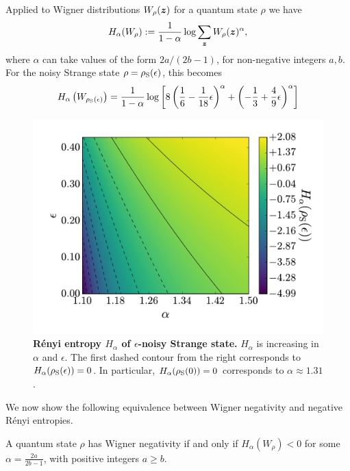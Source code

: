 \documentclass[pra,
aps,
twocolumn,
superscriptaddress,
groupedaddress,
nofootinbib,
reprint
]{revtex4-1}
\begin{document}
Applied to Wigner distributions $W_\rho (\boldsymbol{z})$ for a quantum state $\rho$ we have
\begin{equation}
	H_\alpha(W_\rho) := \frac{1}{1-\alpha} \log \sum_{\bm{z}} W_{\rho}(\bm{z})^\alpha,
\end{equation}
where $\alpha$ can take values of the form $2a / (2b-1)$, for non-negative integers $a,b$. For the noisy Strange state $\rho = \rho_{\rm{S}}(\epsilon)$, this becomes
\begin{align}
	H_{\alpha}\left(W_{\rho_{\rm{S}}(\epsilon)}\right) = \frac{1}{1-\alpha}\log \left[ 8\left( \frac{1}{6} - \frac{1}{18}\epsilon \right)^\alpha + \left(-\frac{1}{3} + \frac{4}{9}\epsilon \right)^\alpha \right] \nonumber\\
\end{align}
\begin{figure}[t!]
    \centering
    \includegraphics[scale=0.35]{figs/H_vs_eps_a.pdf}
    \caption{\textbf{R\'{e}nyi entropy $H_\alpha$ of $\epsilon$-noisy Strange state.} $H_\alpha$ is increasing in $\alpha$ and $\epsilon$. The first dashed contour from the right corresponds to $H_\alpha(\rho_{\rm{S}}(\epsilon)) = 0$. In particular, $H_\alpha(\rho_{\rm{S}}(0)) = 0$ corresponds to $\alpha \approx 1.31$.
    }
    \label{fig:H}
\end{figure}
We now show the following equivalence between Wigner negativity and negative R\'{e}nyi entropies.
\begingroup
\def\thetheorem{\ref{thm:HSchur}}
\begin{theorem}
	A quantum state $\rho$ has Wigner negativity if and only if $H_\alpha(W_\rho) < 0$ for some $\alpha =  \frac{2a}{2b-1}$, with positive integers $a \geq b$.
\end{theorem}
\end{document}
